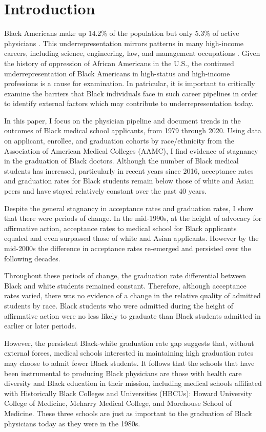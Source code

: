 \documentclass[12pt]{article}
\begin{document}
\doublespacing


\section{Introduction} \label{sec:introduction}

Black Americans make up 14.2\% of the population but only 5.3\% of active physicians \citep{aamc_2021_2022}. This underrepresentation mirrors patterns in many high-income careers, including science, engineering, law, and management occupations \citep{wilson_racial_2021}. Given the history of oppression of African Americans in the U.S., the continued underrepresentation of Black Americans in high-status and high-income professions is a cause for examination. In patricular, it is important to critically examine the barriers that Black individuals face in such career pipelines in order to identify external factors which may contribute to underrepresentation today. 

In this paper, I focus on the physician pipeline and document trends in the outcomes of Black medical school applicants, from 1979 through 2020. Using data on applicant, enrollee, and graduation cohorts by race/ethnicity from the Association of American Medical Colleges (AAMC), I find evidence of stagnancy in the graduation of Black doctors. Although the number of Black medical students has increased, particularly in recent years since 2016, acceptance rates and graduation rates for Black students remain below those of white and Asian peers and have stayed relatively constant over the past 40 years. 

Despite the general stagnancy in acceptance rates and graduation rates, I show that there were periods of change. In the mid-1990s, at the height of advocacy for affirmative action, acceptance rates to medical school for Black applicants equaled and even surpassed those of white and Asian applicants. However by the mid-2000s the difference in acceptance rates re-emerged and persisted over the following decades. 

Throughout these periods of change, the graduation rate differential between Black and white students remained constant. Therefore, although acceptance rates varied, there was no evidence of a change in the relative quality of admitted students by race. Black students who were admitted during the height of affirmative action were no less likely to graduate than Black students admitted in earlier or later periods. 

However, the persistent Black-white graduation rate gap suggests that, without external forces, medical schools interested in maintaining high graduation rates may choose to admit fewer Black students. It follows that the schools that have been instrumental to producing Black physicians are those with health care diversity and Black education in their mission, including medical schools affiliated with Historically Black Colleges and Universities (HBCUs): Howard University College of Medicine, Meharry Medical College, and Morehouse School of Medicine. These three schools are just as important to the graduation of Black physicians today as they were in the 1980s. 
\end{document}

